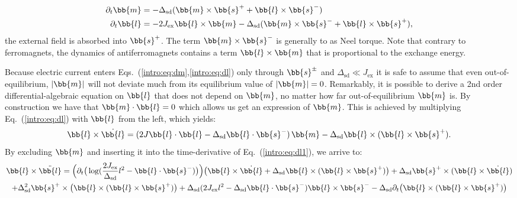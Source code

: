 \begin{align}
    \partial_t \bb{m} &= -\Delta_\text{sd}(\bb{m}\times\bb{s}^++\bb{l}\times\bb{s}^-)\label{intro:eq:dm}\\
        \partial_t \bb{l} &=-2J_\text{ex}\bb{l}\times\bb{m} -\Delta_\text{sd}(\bb{m}\times\bb{s}^-+\bb{l}\times\bb{s}^+),\label{intro:eq:dl}
\end{align}
the external field is absorbed into $\bb{s}^+$. The term $\bb{m}\times\bb{s}^-$ is generally to as Neel torque. Note that contrary to ferromagnets, the dynamics of antiferromagnets contains a term $\bb{l}\times\bb{m}$ that is proportional to the exchange energy. 

Because electric current enters Eqs.~(\ref{intro:eq:dm},\ref{intro:eq:dl}) only through $\bb{s}^\pm$ and $\Delta_\text{sd}\ll J_\text{ex}$ it is safe to assume that even out-of-equilibrium, $|\bb{m}|$ will not deviate much from its equilibrium value of $|\bb{m}|=0$. Remarkably, it is possible to derive a 2nd order differential-algebraic equation on $\bb{l}$ that does not depend on $\bb{m}$, no matter how far out-of-equilibrium $\bb{m}$ is. By construction we have that  $\bb{m}\cdot\bb{l}=0$ which allows us get an expression of $\bb{m}$. This is achieved by multiplying Eq.~(\ref{intro:eq:dl}) with $\bb{l}$ from the left, which yields:
\begin{equation}
    \bb{l}\times\dot{\bb{l}}=(2J \bb{l}\cdot\bb{l}-\Delta_\text{sd}\bb{l}\cdot\bb{s}^-)\,\bb{m}-\Delta_\text{sd}\bb{l}\times(\bb{l}\times\bb{s}^+).\label{intro:eq:dl1}
\end{equation}
By excluding $\bb{m}$ and inserting it into the time-derivative of Eq.~(\ref{intro:eq:dl1}), we arrive to:
\begin{multline}
        \bb{l}\times\ddot{\bb{l}}=
        \Big(\partial_t\big(\log(\frac{2J_\text{ex}}{\Delta_\text{sd}}l^2-\bb{l}\cdot\bb{s}^-)\big)\Big)\big(\bb{l}\times\dot{\bb{l}}+\Delta_\text{sd}\bb{l}\times(\bb{l}\times\bb{s}^+)\big)
        + \Delta_\text{sd}\bb{s}^+\times(\bb{l}\times\dot{\bb{l}})\\
        + \Delta_\text{sd}^2\bb{s}^+\times\big(\bb{l}\times(\bb{l}\times\bb{s}^+)\big)
        + \Delta_\text{sd}(2J_\text{ex} l^2-\Delta_\text{sd}\bb{l}\cdot\bb{s}^-)\bb{l}\times\bb{s}^-
        -\Delta_\text{sd}\partial_t \big(\bb{l}\times(\bb{l}\times\bb{s}^+)\big)
\end{multline}
